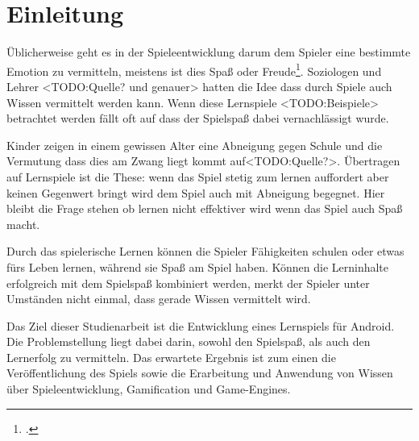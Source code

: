 \section{Einleitung}
	Üblicherweise geht es in der Spieleentwicklung darum dem Spieler eine bestimmte Emotion zu vermitteln, meistens ist dies Spaß oder Freude\footcite[Abstract]{persona}. Soziologen und Lehrer <TODO:Quelle? und genauer> hatten die Idee dass durch Spiele auch Wissen vermittelt werden kann. Wenn diese Lernspiele <TODO:Beispiele> betrachtet werden fällt oft auf dass der Spielspaß dabei vernachlässigt wurde.

	Kinder zeigen in einem gewissen Alter eine Abneigung gegen Schule und die Vermutung dass dies am Zwang liegt kommt auf<TODO:Quelle?>. Übertragen auf Lernspiele ist die These: wenn das Spiel stetig zum lernen auffordert aber keinen Gegenwert bringt wird dem Spiel auch mit Abneigung begegnet.
	Hier bleibt die Frage stehen ob lernen nicht effektiver wird wenn das Spiel auch Spaß macht.

	Durch das spielerische Lernen können die Spieler Fähigkeiten schulen oder etwas fürs Leben lernen, während sie Spaß am Spiel haben. Können die Lerninhalte erfolgreich mit dem Spielspaß kombiniert werden, merkt der Spieler unter Umständen nicht einmal, dass gerade Wissen vermittelt wird.

	Das Ziel dieser Studienarbeit ist die Entwicklung eines Lernspiels für Android. Die Problemstellung liegt dabei darin, sowohl den Spielspaß, als auch den Lernerfolg zu vermitteln. Das erwartete Ergebnis ist zum einen die Veröffentlichung des Spiels sowie die Erarbeitung und Anwendung von Wissen über Spieleentwicklung, Gamification und Game-Engines.

